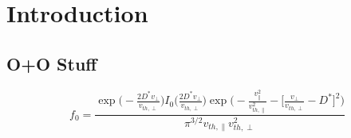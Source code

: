 \chapter{Introduction}

\section{O+O Stuff}

\begin{equation}
	f_0 = \frac{
	\exp\bigg( - \frac{2 D^* v_\perp}{v_{th,\perp}} \bigg) I_0 \bigg(  \frac{2 D^* v_\perp}{v_{th,\perp}} \bigg)  
	\exp \bigg(  -\frac{v_\parallel^2}{v_{th,\parallel}^2} - \Big[ \frac{v_\perp}{v_{th,\perp} } - D^* \Big]^2  \bigg)}{
	\pi^{3/2} v_{th,\parallel} v_{th,\perp}^{2}}
	\label{eq:toroidal_dist}
\end{equation}


